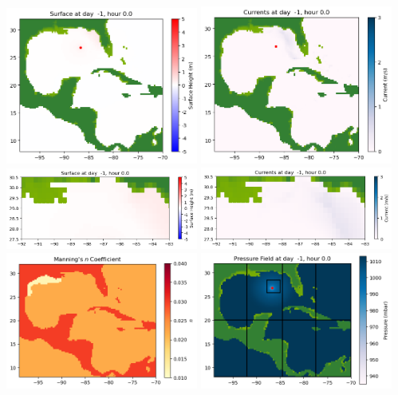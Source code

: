 \documentclass[11pt]{article}
\begin{document}
\vskip 10pt 
\includegraphics[width=0.475\textwidth]{frame0004fig1001.png}
\includegraphics[width=0.475\textwidth]{frame0004fig1002.png}
\vskip 10pt 
\includegraphics[width=0.475\textwidth]{frame0004fig1003.png}
\includegraphics[width=0.475\textwidth]{frame0004fig1004.png}
\vskip 10pt 
\includegraphics[width=0.475\textwidth]{frame0004fig1005.png}
\includegraphics[width=0.475\textwidth]{frame0004fig1006.png}
\end{document}
